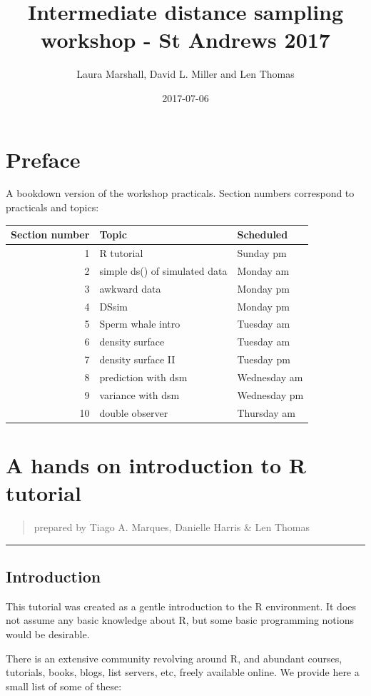 \documentclass[]{book}
\title{Intermediate distance sampling workshop - St Andrews 2017}
\author{Laura Marshall, David L. Miller and Len Thomas}
\date{2017-07-06}
\theoremstyle{definition}
\theoremstyle{definition}
\theoremstyle{remark}
\begin{document}
\maketitle

{
\hypersetup{linkcolor=black}
\setcounter{tocdepth}{1}
\tableofcontents
}
\chapter*{Preface}\label{preface}

A bookdown version of the workshop practicals. Section numbers
correspond to practicals and topics:

\begin{longtable}[]{@{}rll@{}}
\toprule
Section number & Topic & Scheduled\tabularnewline
\midrule
\endhead
1 & R tutorial & Sunday pm\tabularnewline
2 & simple ds() of simulated data & Monday am\tabularnewline
3 & awkward data & Monday pm\tabularnewline
4 & DSsim & Monday pm\tabularnewline
5 & Sperm whale intro & Tuesday am\tabularnewline
6 & density surface & Tuesday am\tabularnewline
7 & density surface II & Tuesday pm\tabularnewline
8 & prediction with dsm & Wednesday am\tabularnewline
9 & variance with dsm & Wednesday pm\tabularnewline
10 & double observer & Thursday am\tabularnewline
\bottomrule
\end{longtable}

\chapter{A hands on introduction to R
tutorial}\label{a-hands-on-introduction-to-r-tutorial}

\begin{quote}
prepared by Tiago A. Marques, Danielle Harris \& Len Thomas
\end{quote}

\begin{center}\rule{0.5\linewidth}{\linethickness}\end{center}

\section{Introduction}\label{introduction}

This tutorial was created as a gentle introduction to the R environment.
It does not assume any basic knowledge about R, but some basic
programming notions would be desirable.

There is an extensive community revolving around R, and abundant
courses, tutorials, books, blogs, list servers, etc, freely available
online. We provide here a small list of some of these:
\end{document}

